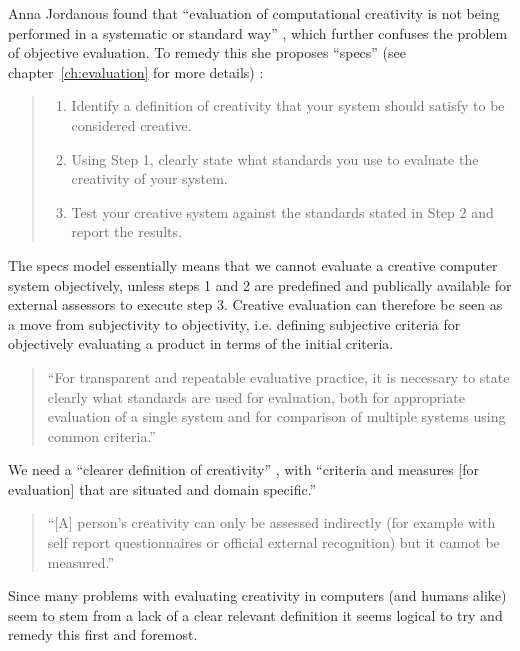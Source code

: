 Anna Jordanous found that ``evaluation of computational creativity is not being performed in a systematic or standard way'' \autocite[p.2]{Jordanous2011}, which further confuses the problem of objective evaluation. To remedy this she proposes ``\gls{specs}'' (see chapter~\ref{ch:evaluation} for more details) \autocite[p.137-140]{Jordanous2012a}:

\begin{quote}
  \begin{enumerate}
    \item Identify a definition of creativity that your system should satisfy to be considered creative.
    \item Using Step 1, clearly state what standards you use to evaluate the creativity of your system.
    \item Test your creative system against the standards stated in Step 2 and report the results.
  \end{enumerate}
\end{quote}

The \gls{specs} model essentially means that we cannot evaluate a creative computer system objectively, unless steps 1 and 2 are predefined and publically available for external assessors to execute step 3. Creative evaluation can therefore be seen as a move from subjectivity to objectivity, i.e. defining subjective criteria for objectively evaluating a product in terms of the initial criteria.

\begin{quotation}
  ``For transparent and repeatable evaluative practice, it is necessary to state clearly what standards are used for evaluation, both for appropriate evaluation of a single system and for comparison of multiple systems using common criteria.'' 
\end{quotation}

We need a ``clearer definition of creativity'' \autocite[p.459]{Mayer1999}, with ``criteria and measures [for evaluation] that are situated and domain specific.'' \autocite[p.7]{Candy2012}

\begin{quotation}
  ``[A] person's creativity can only be assessed indirectly (for example with self report questionnaires or official external recognition) but it cannot be measured.'' 
\end{quotation}

Since many problems with evaluating creativity in computers (and humans alike) seem to stem from a lack of a clear relevant definition it seems logical to try and remedy this first and foremost.


